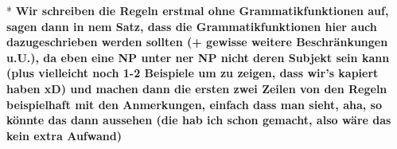 \documentclass[12pt,a4paper]{article}
\begin{document}

* \textbf{Wir schreiben die Regeln erstmal ohne Grammatikfunktionen auf, sagen dann in nem Satz, dass die Grammatikfunktionen hier auch dazugeschrieben werden sollten (+ gewisse weitere Beschränkungen u.U.), da eben eine NP unter ner NP nicht deren Subjekt sein kann (plus vielleicht noch 1-2 Beispiele um zu zeigen, dass wir's kapiert haben xD) und machen dann die ersten zwei Zeilen von den Regeln beispielhaft mit den Anmerkungen, einfach dass man sieht, aha, so könnte das dann aussehen (die hab ich schon gemacht, also wäre das kein extra Aufwand)}
\end{document}
